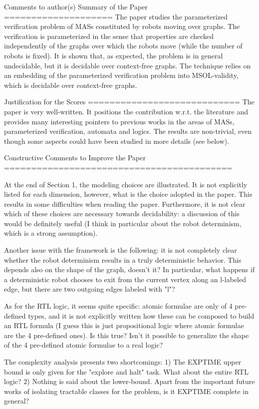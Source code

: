 Comments to author(s)
Summary of the Paper
====================
The paper studies the parameterized verification problem of MASs constituted by robots moving over graphs. The verification is parameterized in the sense that properties are checked independently of the graphs over which the robots move (while the number of robots is fixed). It is shown that, as expected, the problem is in general undecidable, but it is decidable over context-free graphs. The technique relies on an embedding of the parameterized verification problem into MSOL-validity, which is decidable over context-free graphs.

Justification for the Scores
============================
The paper is very well-written. It positions the contribution w.r.t. the literature and provides many interesting pointers to previous works in the areas of MASs, parameterized verification, automata and logics. The results are non-trivial, even though some aspects could have been studied in more details (see below).

Constructive Comments to Improve the Paper
==========================================

At the end of Section 1, the modeling choices are illustrated. It is not explicitly listed for each dimension, however, what is the choice adopted in the paper. This results in some difficulties when reading the paper. Furthermore, it is not clear which of these choices are necessary towards decidability: a discussion of this would be definitely useful (I think in particular about the robot determinism, which is a strong assumption).

Another issue with the framework is the following: it is not completely clear whether the robot determinism results in a truly deterministic behavior. This depends also on the shape of the graph, doesn't it? In particular, what happens if a deterministic robot chooses to exit from the current vertex along an l-labeled edge, but there are two outgoing edges labeled with "l"?

As for the RTL logic, it seems quite specific: atomic formulae are only of 4 pre-defined types, and it is not explicitly written how these can be composed to build an RTL formula (I guess this is just propositional logic where atomic formulae are the 4 pre-defined ones). Is this true? Isn't it possible to generalize the shape of the 4 pre-defined atomic formulae to a real logic?

The complexity analysis presents two shortcomings:
1) The EXPTIME upper bound is only given for the "explore and halt" task. What about the entire RTL logic?
2) Nothing is said about the lower-bound. Apart from the important future works of isolating tractable classes for the problem, is it EXPTIME complete in general?


